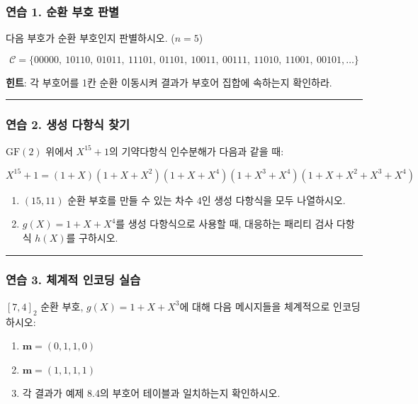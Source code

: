 \documentclass[
  oneside]{article}
\begin{document}
\subsubsection{연습 1. 순환 부호
판별}\label{uxc5f0uxc2b5-1.-uxc21cuxd658-uxbd80uxd638-uxd310uxbcc4}

다음 부호가 순환 부호인지 판별하시오. (\(n = 5\))

\[\mathcal{C} = \{00000,\ 10110,\ 01011,\ 11101,\ 01101,\ 10011,\ 00111,\ 11010,\ 11001,\ 00101, \dots\}\]

\textbf{힌트}: 각 부호어를 1칸 순환 이동시켜 결과가 부호어 집합에
속하는지 확인하라.

\begin{center}\rule{0.5\linewidth}{0.5pt}\end{center}

\subsubsection{연습 2. 생성 다항식
찾기}\label{uxc5f0uxc2b5-2.-uxc0dduxc131-uxb2e4uxd56duxc2dd-uxcc3euxae30}

\(\text{GF}(2)\) 위에서 \(X^{15} + 1\)의 기약다항식 인수분해가 다음과
같을 때:

\[X^{15} + 1 = (1+X)(1+X+X^2)(1+X+X^4)(1+X^3+X^4)(1+X+X^2+X^3+X^4)\]

\begin{enumerate}
\def\labelenumi{(\alph{enumi})}
\item
  \((15, 11)\) 순환 부호를 만들 수 있는 차수 4인 생성 다항식을 모두
  나열하시오.
\item
  \(g(X) = 1 + X + X^4\)를 생성 다항식으로 사용할 때, 대응하는 패리티
  검사 다항식 \(h(X)\)를 구하시오.
\end{enumerate}

\begin{center}\rule{0.5\linewidth}{0.5pt}\end{center}

\subsubsection{연습 3. 체계적 인코딩
실습}\label{uxc5f0uxc2b5-3.-uxccb4uxacc4uxc801-uxc778uxcf54uxb529-uxc2e4uxc2b5}

\([7, 4]_2\) 순환 부호, \(g(X) = 1 + X + X^3\)에 대해 다음 메시지들을
체계적으로 인코딩하시오:

\begin{enumerate}
\def\labelenumi{(\alph{enumi})}
\item
  \(\mathbf{m} = (0, 1, 1, 0)\)
\item
  \(\mathbf{m} = (1, 1, 1, 1)\)
\item
  각 결과가 예제 8.4의 부호어 테이블과 일치하는지 확인하시오.
\end{enumerate}
\end{document}
